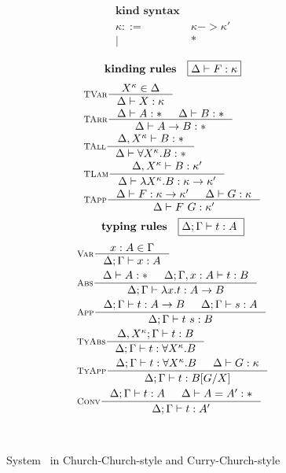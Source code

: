 \begin{figure}
\begin{singlespace}
\begin{minipage}{.46\textwidth}
\begin{align*}
\textbf{kind syntax} \\
\kappa ::= &~ \kappa -> \kappa' \\
         | &~ *                 \\
\end{align*}
\[ \textbf{kinding rules} \quad \framebox{$ \Delta |- F:\kappa$}\]\vspace*{-1em}
\begin{align*}
& \inference[\sc TVar]{X^\kappa \in \Delta}{\Delta |- X:\kappa} \\
& \inference[\sc TArr]{\Delta |- A:* & \Delta |- B:*}{\Delta |- A -> B:*} \\
& \inference[\sc TAll]{\Delta,X^\kappa |- B:*}{\Delta |- \forall X^\kappa.B:*} \\
& \inference[\sc TLam]{\Delta,X^\kappa |- B:\kappa'}
		      {\Delta |- \l X^\kappa.B:\kappa -> \kappa'} \\
& \inference[\sc TApp]{\Delta |- F : \kappa -> \kappa' & \Delta |- G : \kappa}
		      {\Delta |- F ~ G : \kappa'} \\
\end{align*}
\[ \textbf{typing rules} \quad \framebox{$ \Delta;\Gamma |- t : A $ } \]
\vspace*{-1em}
\begin{align*}
& \inference[\sc Var]{x:A \in \Gamma}{\Delta;\Gamma |- x:A} \\
& \inference[\sc Abs]{\Delta |- A:* & \Delta;\Gamma,x:A |- t : B}
		     {\Delta;\Gamma |- \l x   .t : A -> B} \\
& \inference[\sc App]{\Delta;\Gamma |- t : A -> B & \Delta;\Gamma |- s : A}
		     {\Delta;\Gamma |- t~s : B} \\
& \inference[\sc TyAbs]{\Delta,X^\kappa;\Gamma |- t : B}
		       {\Delta;\Gamma |- t : \forall X^\kappa.B} \\
& \inference[\sc TyApp]{\Delta;\Gamma |- t : \forall X^\kappa.B & \Delta |- G:\kappa}
		       {\Delta;\Gamma |- t : B[G/X]} \\
& \inference[\sc Conv]{\Delta;\Gamma |- t : A & \Delta |- A = A' : *}
		      {\Delta;\Gamma |- t : A'}
\end{align*}
\end{minipage}
~\\
\caption{System \Fw\ in Church-Church-style and Curry-Church-style}
\label{fig:fw}
\end{singlespace}
\end{figure}

